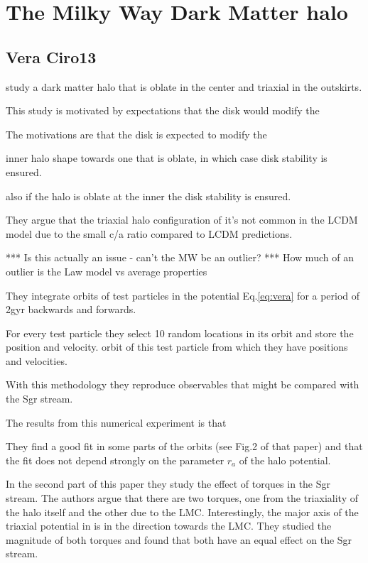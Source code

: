 \documentclass[12pt]{article}
\begin{document}
\section{The Milky Way Dark Matter halo}\label{mw}
\subsection{Vera Ciro13}

\citep{Vera13} study a dark matter halo that is oblate in the center
 and triaxial in the outskirts. 

This study is motivated by expectations that the disk would modify the 

The motivations are that the disk is expected
 to modify the

 inner halo shape towards one that is oblate, in which case disk stability 
is ensured.  

also if the
halo is oblate at the inner the disk stability is ensured. 

They
argue that the triaxial halo configuration of \citep{Law10} it's
not common in the LCDM model due to the small c/a ratio compared to
LCDM predictions.

*** Is this actually an issue - can’t the MW be an outlier?   
***  How much of an outlier is the Law model vs average properties


They integrate orbits of test particles in the potential Eq.\ref{eq:vera} for a period
of 2gyr backwards and forwards. 

For every test particle they select 10 random locations 
in its orbit and store the position and velocity. 
orbit of this test particle from which they have positions and velocities.

 With this methodology they reproduce observables that might be compared with 
the Sgr stream.

The results from this numerical experiment is that 

They find  a good fit in some
parts of the orbits (see Fig.2 of that paper) and that the fit does not depend
strongly on the parameter $r_a$ of the halo potential.

In the second part of this paper they study the effect of torques in the Sgr
stream. The authors argue that there are two torques, one from the triaxiality
of the halo itself and the other due to the LMC. Interestingly, the major
axis of the triaxial potential in \citep{Law10} is in the direction towards
 the LMC. They studied the magnitude of both torques and found that both
have an equal effect on the Sgr stream.
\end{document}
